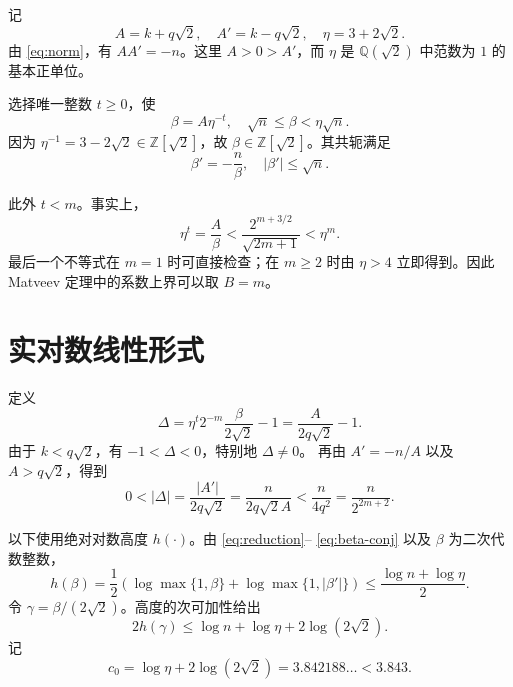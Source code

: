 \documentclass[11pt,a4paper]{ctexart}
\theoremstyle{remark}
\newcommand{\Q}{\mathbb Q}
\newcommand{\Z}{\mathbb Z}
\begin{document}
记
\[
 A=k+q\sqrt2,\quad A'=k-q\sqrt2,\quad
 \eta=3+2\sqrt2.
\]
由 \eqref{eq:norm}，有 \(AA'=-n\)。这里 \(A>0>A'\)，而
\(\eta\) 是 \(\Q(\sqrt2)\) 中范数为 \(1\) 的基本正单位。

选择唯一整数 \(t\ge0\)，使
\begin{equation}\label{eq:reduction}
 \beta=A\eta^{-t},\quad
 \sqrt n\le\beta<\eta\sqrt n.
\end{equation}
因为 \(\eta^{-1}=3-2\sqrt2\in\Z[\sqrt2]\)，故
\(\beta\in\Z[\sqrt2]\)。其共轭满足
\begin{equation}\label{eq:beta-conj}
 \beta'=-\frac n\beta,\quad |\beta'|\le\sqrt n.
\end{equation}

此外 \(t<m\)。事实上，
\[
 \eta^t=\frac A\beta
 <\frac{2^{m+3/2}}{\sqrt{2m+1}}<\eta^m.
\]
最后一个不等式在 \(m=1\) 时可直接检查；在 \(m\ge2\) 时由
\(\eta>4\) 立即得到。因此 Matveev 定理中的系数上界可以取 \(B=m\)。

\section{实对数线性形式}

定义
\begin{equation}\label{eq:Delta}
 \Delta=\eta^t2^{-m}\frac{\beta}{2\sqrt2}-1
       =\frac{A}{2q\sqrt2}-1.
\end{equation}
由于 \(k<q\sqrt2\)，有 \(-1<\Delta<0\)，特别地 \(\Delta\ne0\)。
再由 \(A'=-n/A\) 以及 \(A>q\sqrt2\)，得到
\begin{equation}\label{eq:upperDelta}
 0<|\Delta|=\frac{|A'|}{2q\sqrt2}
 =\frac{n}{2q\sqrt2 A}
 <\frac{n}{4q^2}=\frac{n}{2^{2m+2}}.
\end{equation}

以下使用绝对对数高度 \(h(\cdot)\)。由 \eqref{eq:reduction}--
\eqref{eq:beta-conj} 以及 \(\beta\) 为二次代数整数，
\begin{equation}\label{eq:hbeta}
 h(\beta)
 =\frac12\left(\log\max\{1,\beta\}
       +\log\max\{1,|\beta'|\}\right)
 \le\frac{\log n+\log\eta}{2}.
\end{equation}
令 \(\gamma=\beta/(2\sqrt2)\)。高度的次可加性给出
\begin{equation}\label{eq:hgamma}
 2h(\gamma)
 \le \log n+\log\eta+2\log(2\sqrt2).
\end{equation}
记
\begin{equation}\label{eq:c0}
 c_0=\log\eta+2\log(2\sqrt2)
     =3.842188\ldots<3.843.
\end{equation}
\end{document}
